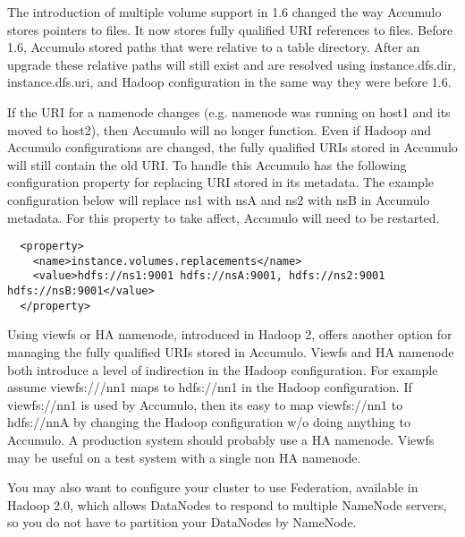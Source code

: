 The introduction of multiple volume support in 1.6 changed the way Accumulo
stores pointers to files.  It now stores fully qualified URI references to
files.  Before 1.6, Accumulo stored paths that were relative to a table
directory.   After an upgrade these relative paths will still exist and are
resolved using instance.dfs.dir, instance.dfs.uri, and Hadoop configuration in
the same way they were before 1.6. 

If the URI for a namenode changes (e.g. namenode was running on host1 and its
moved to host2), then Accumulo will no longer function.  Even if Hadoop and
Accumulo configurations are changed, the fully qualified URIs stored in
Accumulo will still contain the old URI.  To handle this Accumulo has the
following configuration property for replacing URI stored in its metadata.  The
example configuration below will replace ns1 with nsA and ns2 with nsB in
Accumulo metadata.  For this property to take affect, Accumulo will need to be
restarted.

\begingroup\fontsize{8pt}{8pt}\selectfont\begin{verbatim}
  <property>
    <name>instance.volumes.replacements</name>
    <value>hdfs://ns1:9001 hdfs://nsA:9001, hdfs://ns2:9001 hdfs://nsB:9001</value>
  </property>
\end{verbatim}\endgroup

Using viewfs or HA namenode, introduced in Hadoop 2, offers another option for
managing the fully qualified URIs stored in Accumulo.  Viewfs and HA namenode
both introduce a level of indirection in the Hadoop configuration.   For
example assume viewfs:///nn1 maps to hdfs://nn1 in the Hadoop configuration.
If viewfs://nn1 is used by Accumulo, then its easy to map viewfs://nn1 to
hdfs://nnA by changing the Hadoop configuration w/o doing anything to Accumulo.
A production system should probably use a HA namenode.  Viewfs may be useful on
a test system with a single non HA namenode.

You may also want to configure your cluster to use Federation,
available in Hadoop 2.0, which allows DataNodes to respond to multiple
NameNode servers, so you do not have to partition your DataNodes by
NameNode.
